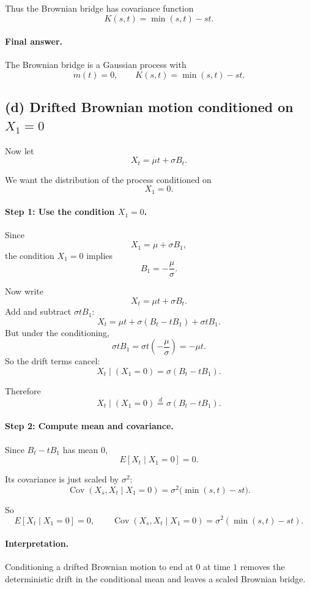 \documentclass[11pt]{article}
\begin{document}
Thus the Brownian bridge has covariance function
\[
\boxed{
K(s,t)=\min(s,t)-st.
}
\]

\paragraph{Final answer.}

The Brownian bridge is a Gaussian process with
\[
\boxed{
m(t)=0,
\qquad
K(s,t)=\min(s,t)-st.
}
\]

\subsection*{(d) Drifted Brownian motion conditioned on $X_1=0$}

Now let
\[
X_t=\mu t+\sigma B_t.
\]

We want the distribution of the process conditioned on
\[
X_1=0.
\]

\paragraph{Step 1: Use the condition $X_1=0$.}

Since
\[
X_1=\mu+\sigma B_1,
\]
the condition $X_1=0$ implies
\[
B_1=-\frac{\mu}{\sigma}.
\]

Now write
\[
X_t=\mu t+\sigma B_t.
\]
Add and subtract $\sigma t B_1$:
\[
X_t
=
\mu t+\sigma(B_t-tB_1)+\sigma t B_1.
\]
But under the conditioning,
\[
\sigma t B_1=\sigma t\left(-\frac{\mu}{\sigma}\right)=-\mu t.
\]
So the drift terms cancel:
\[
X_t\mid (X_1=0)
=
\sigma(B_t-tB_1).
\]

Therefore
\[
\boxed{
X_t\mid (X_1=0)
\overset{d}{=}
\sigma(B_t-tB_1).
}
\]

\paragraph{Step 2: Compute mean and covariance.}

Since $B_t-tB_1$ has mean $0$,
\[
E[X_t\mid X_1=0]=0.
\]

Its covariance is just scaled by $\sigma^2$:
\[
\operatorname{Cov}(X_s,X_t\mid X_1=0)
=
\sigma^2\bigl(\min(s,t)-st\bigr).
\]

So
\[
\boxed{
E[X_t\mid X_1=0]=0,
\qquad
\operatorname{Cov}(X_s,X_t\mid X_1=0)
=
\sigma^2(\min(s,t)-st).
}
\]

\paragraph{Interpretation.}  
Conditioning a drifted Brownian motion to end at $0$ at time $1$ removes the deterministic drift in the conditional mean and leaves a scaled Brownian bridge.
\end{document}
